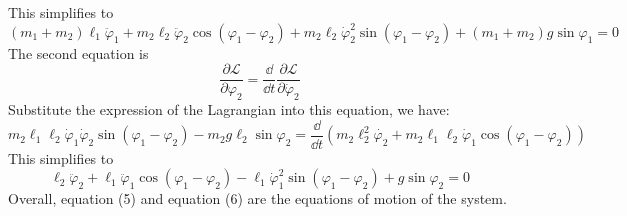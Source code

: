 \documentclass[11pt]{article}
\def\LL{{\mathcal L}}
\begin{document}
This simplifies to
\begin{equation}
  (m_1+m_2)\ell_1 \ddot{\varphi}_1 + m_2 \ell_2 \ddot{\varphi}_2\cos(\varphi_1 - \varphi_2)
  + m_2\ell_2\dot{\varphi}_2^2 \sin(\varphi_1 - \varphi_2) + (m_1+m_2)g \sin\varphi_1 = 0
\end{equation}
The second equation is
\begin{equation*}
  \frac{\partial \LL}{\partial \varphi_2} = \frac{\dd}{\dd t} \frac{\partial \LL}{\partial \dot{\varphi}_2}
\end{equation*}
Substitute the expression of the Lagrangian into this equation, we have:
\begin{equation*}
  m_2 \ell_1\ell_2 \dot{\varphi}_1\dot{\varphi}_2\sin(\varphi_1 - \varphi_2) - m_2g\ell_2 \sin\varphi_2
  =
  \frac{\dd}{\dd t}(m_2\ell_2^2 \dot{\varphi_2} + m_2\ell_1\ell_2\dot{\varphi}_1\cos(\varphi_1-\varphi_2))
\end{equation*}
This simplifies to
\begin{equation}
  \ell_2 \ddot{\varphi}_2 +  \ell_1\ddot{\varphi}_1\cos(\varphi_1-\varphi_2)
  -
    \ell_1\dot{\varphi}_1^2\sin(\varphi_1-\varphi_2) +  g \sin\varphi_2 = 0
\end{equation}
Overall, equation (5) and equation (6) are the equations of motion of the system.
\end{document}
